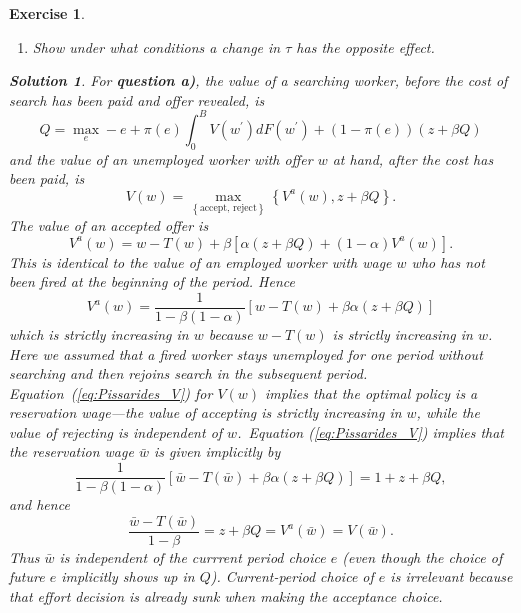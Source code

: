 \documentclass[11pt]{article}
\newtheorem{exercise}[theorem]{Exercise}
\newtheorem{solution}[theorem]{Solution}
\begin{document}
\begin{exercise}
\begin{enumerate}
\item[c)] Show under what conditions a change in $\tau $ has the opposite
effect.
\end{enumerate}

\begin{solution}
For \textbf{question a)}, the value of a searching worker, before the cost
of search has been paid and offer revealed, is%
\begin{equation}
Q=\max_{e}-e+\pi \left( e\right) \int_{0}^{B}V\left( w^{\prime }\right)
dF\left( w^{\prime }\right) +\left( 1-\pi \left( e\right) \right) \left(
z+\beta Q\right)   \label{eq:Pissarides_Q}
\end{equation}%
and the value of an unemployed worker with offer $w$ at hand, after the cost
has been paid, is%
\begin{equation}
V\left( w\right) =\max_{\left\{ \text{accept, reject}\right\} }\left\{
V^{a}\left( w\right) ,z+\beta Q\right\} .  \label{eq:Pissarides_V}
\end{equation}%
The value of an accepted offer is%
\begin{equation*}
V^{a}\left( w\right) =w-T\left( w\right) +\beta \left[ \alpha \left( z+\beta
Q\right) +\left( 1-\alpha \right) V^{a}\left( w\right) \right] \text{.}
\end{equation*}%
This is identical to the value of an employed worker with wage $w$ who has
not been fired at the beginning of the period. Hence%
\begin{equation*}
V^{a}\left( w\right) =\frac{1}{1-\beta \left( 1-\alpha \right) }\left[
w-T\left( w\right) +\beta \alpha \left( z+\beta Q\right) \right] 
\end{equation*}%
which is strictly increasing in $w$ because $w-T\left( w\right) $ is
strictly increasing in $w$. Here we assumed that a fired worker stays
unemployed for one period without searching and then rejoins search in the
subsequent period. Equation\ (\ref{eq:Pissarides_V}) for $V\left( w\right) $
implies that the optimal policy is a reservation wage---the value of
accepting is strictly increasing in $w$, while the value of rejecting is
independent of $w$.\ Equation (\ref{eq:Pissarides_V}) implies that the
reservation wage $\bar{w}$ is given implicitly by%
\begin{equation*}
\frac{1}{1-\beta \left( 1-\alpha \right) }\left[ \bar{w}-T\left( \bar{w}%
\right) +\beta \alpha \left( z+\beta Q\right) \right] =1+z+\beta Q,
\end{equation*}%
and hence%
\begin{equation}
\frac{\bar{w}-T\left( \bar{w}\right) }{1-\beta }=z+\beta Q=V^{a}\left( \bar{w%
}\right) =V\left( \bar{w}\right) .  \label{eq:Pissarides_wbar}
\end{equation}%
Thus $\bar{w}$ is independent of the currrent period choice $e$ (even though
the choice of future $e$ implicitly shows up in $Q$). Current-period choice
of $e$ is irrelevant because that effort decision is already sunk when
making the acceptance choice.


\end{solution}
\end{exercise}
\end{document}
